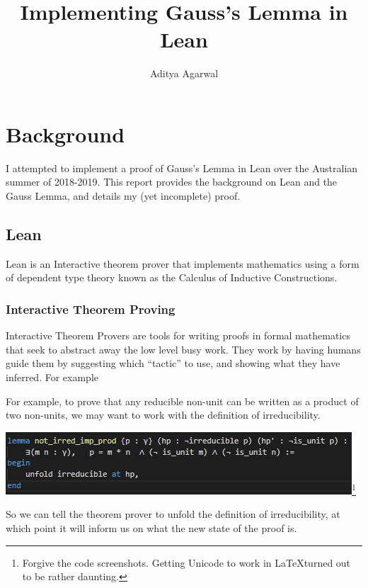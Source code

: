 \documentclass[pagesize=a4]{scrreprt}
\title{Implementing Gauss's Lemma in Lean}
\author{Aditya Agarwal}
\begin{document}
\maketitle

\chapter{Background}

I attempted to implement a proof of Gauss's Lemma in Lean over the Australian summer of 2018-2019. This report provides the background on Lean and the Gauss Lemma, and details my (yet incomplete) proof.  

\section{Lean}

Lean is an Interactive theorem prover that implements mathematics using a form of dependent type theory known as the Calculus of Inductive Constructions. 

\subsection{Interactive Theorem Proving}

Interactive Theorem Provers are tools for writing proofs in formal mathematics that seek to abstract away the low level busy work. They work by having humans guide them by suggesting which ``tactic'' to use, and showing what they have inferred. For example 

For example, to prove that any reducible non-unit can be written as a product of two non-units, we may want to work with the definition of irreducibility. 

\smallskip

\begin{center}

\includegraphics{tactic_example.png}\footnote{Forgive the code screenshots. Getting Unicode to work in \LaTeX turned out to be rather daunting. }

\end{center}
\smallskip

So we can tell the theorem prover to unfold the definition of irreducibility, at which point it will inform us on what the new state of the proof is. 
\end{document}
